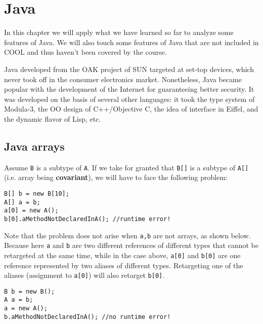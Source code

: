 \ifx\PREAMBLE\undefined


\fi
\chapter{Java}
In this chapter we will apply what we have learned so far to analyze some features of Java. We will also touch some features of Java that are not included in COOL and thus haven't been covered by the course.

Java developed from the OAK project of SUN targeted at set-top devices, which never took off in the consumer electronics market. Nonetheless, Java became popular with the development of the Internet for guaranteeing better security. It was developed on the basis of several other languages: it took the type system of Modula-3, the OO design of C++/Objective C, the idea of interface in Eiffel, and the dynamic flavor of Lisp, etc. 
\section{Java arrays}
Assume \texttt{B} is a subtype of \texttt{A}. If we take for granted that \texttt{B[]} is a subtype of \texttt{A[]} (i.e. array being \textbf{covariant}), we will have to face the following problem:
\begin{lstlisting}
B[] b = new B[10];
A[] a = b;
a[0] = new A();
b[0].aMethodNotDeclaredInA(); //runtime error!
\end{lstlisting}
Note that the problem does not arise when \texttt{a,b} are not arrays, as shown below. Because here \texttt{a} and \texttt{b} are two different references of different types that cannot be retargeted at the same time, while in the case above, \texttt{a[0]} and \texttt{b[0]} are one reference represented by two aliases of different types. Retargeting one of the aliases (assignment to \texttt{a[0]}) will also retarget \texttt{b[0]}. 
\begin{lstlisting}
B b = new B();
A a = b;
a = new A();
b.aMethodNotDeclaredInA(); //no runtime error!
\end{lstlisting}

